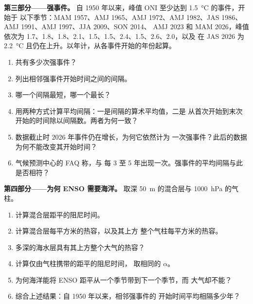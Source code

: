 \begin{problem}
\medskip\noindent\textbf{第三部分——强事件。}
自 1950 年以来，峰值 ONI 至少达到 \qty{1.5}{\celsius} 的事件，开始于
以下季节：MAM 1957、AMJ 1965、AMJ 1972、AMJ 1982、JAS 1986、AMJ 1991、AMJ 1997、JJA 2009、SON 2014、
AMJ 2023 和 MAM 2026，峰值依次为 1.7、1.8、1.8、2.1、1.5、1.5、2.4、1.5、2.6、2.0，以及
在 JAS 2026 为 \qty{2.2}{\celsius} 且仍在上升。以年计，从各事件开始的年份起算。
\begin{enumerate}[resume]
  \item 共有多少次强事件？
  \item 列出相邻强事件开始时间之间的间隔。
  \item 哪一个间隔最短，哪一个最长？
  \item 用两种方式计算平均间隔：一是间隔的算术平均值，二是
        从首次开始到末次开始的时间除以间隔数。两者为何一致？
  \item 数据截止时 2026 年事件仍在增长，为何它依然计为
        一次强事件？此后的数据为何不能改变其开始时间？
  \item 气候预测中心的 FAQ 称，与
        每 3 至 5 年出现一次。强事件的平均间隔与此是否相符？
\end{enumerate}

\medskip\noindent\textbf{第四部分——为何 ENSO 需要海洋。}
取深 \qty{50}{m} 的混合层与 \qty{1000}{hPa} 的气柱。
\begin{enumerate}[resume]
  \item 计算混合层距平的阻尼时间。
  \item 计算混合层每平方米的热容，以及其上方
        整个气柱每平方米的热容。
  \item 多深的海水层具有其上方整个大气的热容？
  \item 计算仅由气柱携带的距平的阻尼时间，
        取相同的 $\alpha$。
  \item 为何海洋能将 ENSO 距平从一个季节带到下一个季节，而
        大气却不能？
  \item 综合上述结果：自 1950 年以来，相邻强事件的
        开始时间平均相隔多少年？
\end{enumerate}
\end{problem}
